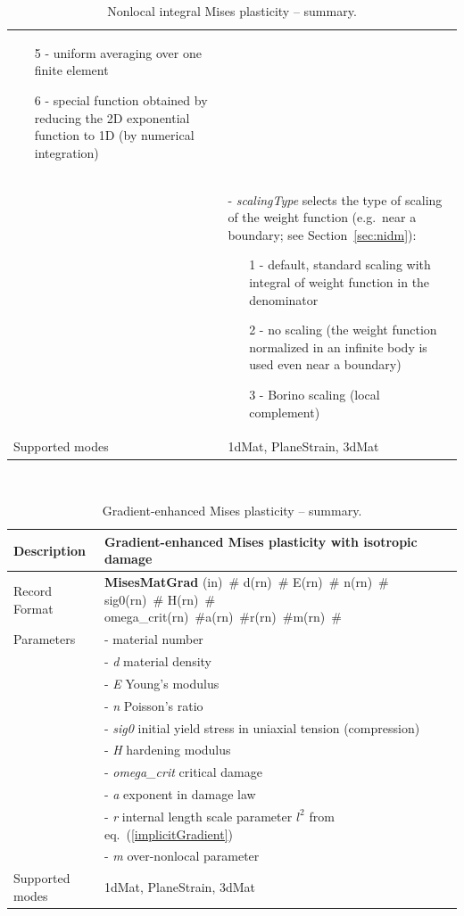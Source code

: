 \documentclass[a4paper]{article}
\newcommand{\descitem}[1]{{\noindent \bf #1}}
\newcommand{\elemparam}[2]{{{#1\tiny (#2)}~\#}}
\newcommand{\param}[1]{{\it #1}}
\newenvironment{mmt}{\begin{tabular}{|l|p{9cm}|}}{\end{tabular}\\}
\newenvironment{mmt}{\begin{tabular}{|l|l|}}{\end{tabular}\\}
\begin{document}
\begin{table}[!htb]
\begin{mmt}
\begin{itemize}
\item[5 -] uniform averaging over one finite element
\item[6 -] special function obtained by reducing the 2D exponential function to 1D (by numerical integration)
\end{itemize}\\
&- \param{scalingType} selects the type of scaling of the weight function (e.g.\ near a boundary; see Section~\ref{sec:nidm}):
\begin{itemize}\setlength{\itemsep}{-5pt}
\item[1 -] default, standard scaling with integral of weight function in the denominator
\item[2 -] no scaling (the weight function normalized in an infinite body is used even near a boundary)
\item[3 -] Borino scaling (local complement)
\end{itemize}\\
Supported modes& 1dMat, PlaneStrain, 3dMat\\
\hline
\end{mmt}
\caption{Nonlocal integral Mises plasticity -- summary.}
\label{misesMatNl_table}
\end{table}
\begin{table}[!htb]
\begin{mmt}
\hline
Description & Gradient-enhanced Mises plasticity with isotropic damage\\
\hline
Record Format & \descitem{MisesMatGrad}  \elemparam{}{in}
\elemparam{d}{rn} \elemparam{E}{rn} \elemparam{n}{rn} \elemparam{sig0}{rn} \elemparam{H}{rn} \elemparam{omega\_crit}{rn}\elemparam{a}{rn}\elemparam{r}{rn}\elemparam{m}{rn}\\
Parameters &- \param{} material number\\
&- \param{d} material density\\
&- \param{E} Young's modulus\\
&- \param{n} Poisson's ratio\\
&- \param{sig0} initial yield stress in uniaxial tension (compression)\\
&- \param{H} hardening modulus\\
&- \param{omega\_crit} critical damage\\
&- \param{a} exponent in damage law\\
&- \param{r} internal length scale parameter $l^2$ from eq.~(\ref{implicitGradient})\\
&- \param{m} over-nonlocal parameter\\
Supported modes& 1dMat, PlaneStrain, 3dMat\\
\hline
\end{mmt}
\caption{Gradient-enhanced Mises plasticity -- summary.}
\label{misesMatGrad_table}
\end{table}
\end{document}
